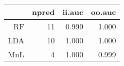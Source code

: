 \begin{table}[ht]
\centering
\begin{tabular}{rrrr}
  \hline
 & npred & ii.auc & oo.auc \\ 
  \hline
RF &   11 & 0.999 & 1.000 \\ 
  LDA &   10 & 1.000 & 1.000 \\ 
  MnL &    4 & 1.000 & 0.999 \\ 
   \hline
\end{tabular}
\label{tab:second_res}
\end{table}
